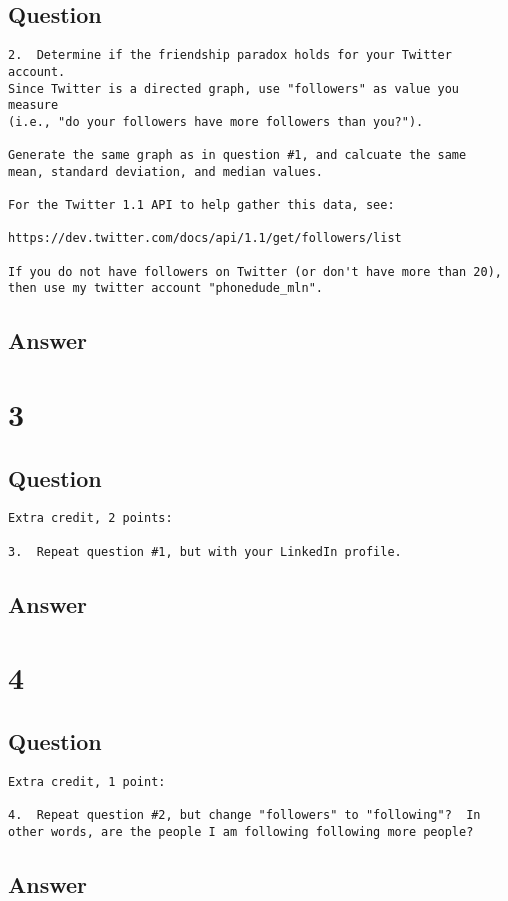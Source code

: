 \documentclass[letterpaper,11pt]{article}
\begin{document}
\subsection*{Question}

\begin{verbatim}
2.  Determine if the friendship paradox holds for your Twitter account.
Since Twitter is a directed graph, use "followers" as value you measure
(i.e., "do your followers have more followers than you?").

Generate the same graph as in question #1, and calcuate the same 
mean, standard deviation, and median values.

For the Twitter 1.1 API to help gather this data, see:

https://dev.twitter.com/docs/api/1.1/get/followers/list

If you do not have followers on Twitter (or don't have more than 20),
then use my twitter account "phonedude_mln".
\end{verbatim}

\newpage
\subsection*{Answer}

\newpage
\section*{3}

\subsection*{Question}

\begin{verbatim}
Extra credit, 2 points:

3.  Repeat question #1, but with your LinkedIn profile.
\end{verbatim}

\newpage
\subsection*{Answer}

\newpage
\section*{4}

\subsection*{Question}

\begin{verbatim}
Extra credit, 1 point:

4.  Repeat question #2, but change "followers" to "following"?  In
other words, are the people I am following following more people?
\end{verbatim}

\newpage
\subsection*{Answer}


\clearpage


\end{document}
